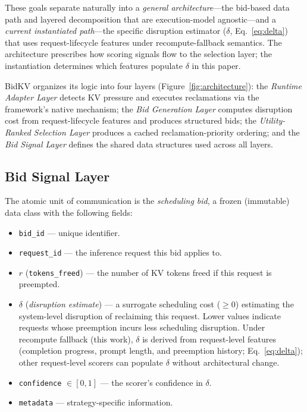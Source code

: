 \documentclass[sigconf,nonacm]{acmart}
\newcommand{\bidkv}{BidKV\xspace}
\newcommand{\tokfree}{\ensuremath{r}}
\newcommand{\qualdelta}{\ensuremath{\delta}}
\begin{document}
These goals separate naturally into a \emph{general architecture}---the
bid-based data path and layered decomposition that are execution-model
agnostic---and a \emph{current instantiated path}---the specific disruption
estimator ($\qualdelta$, Eq.~\ref{eq:delta}) that uses request-lifecycle
features under recompute-fallback semantics.  The architecture prescribes how
scoring signals flow to the selection layer; the instantiation determines which features
populate $\qualdelta$ in this paper.

\noindent
\bidkv organizes its logic into four layers (Figure~\ref{fig:architecture}): the
\emph{Runtime Adapter Layer} detects KV pressure and executes reclamations via
the framework's native mechanism; the \emph{Bid Generation Layer} computes
disruption cost from request-lifecycle features and produces structured bids;
the \emph{Utility-Ranked Selection Layer}
produces a cached reclamation-priority ordering; and the \emph{Bid Signal Layer}
defines the shared data structures used across all layers.



\subsection{Bid Signal Layer}\label{sec:design:bid}

The atomic unit of communication is the \emph{scheduling bid}, a frozen
(immutable) data class with the following fields:

\begin{itemize}[leftmargin=*,nosep]
\item \texttt{bid\_id} --- unique identifier.
\item \texttt{request\_id} --- the inference request this bid applies to.
\item $\tokfree$ (\texttt{tokens\_freed}) --- the number of KV tokens freed if
  this request is preempted.
\item $\qualdelta$ (\emph{disruption estimate}) --- a surrogate scheduling cost
  ($\geq 0$) estimating the system-level disruption of reclaiming this request.
  Lower values indicate requests whose preemption incurs less scheduling
  disruption.  Under recompute fallback (this work), $\qualdelta$ is derived
  from request-level features (completion progress, prompt length, and
  preemption history; Eq.~\ref{eq:delta}); other request-level scorers
  can populate $\qualdelta$ without architectural change.
\item \texttt{confidence} $\in [0, 1]$ --- the scorer's confidence in
  $\qualdelta$.
\item \texttt{metadata} --- strategy-specific information.
\end{itemize}
\end{document}
